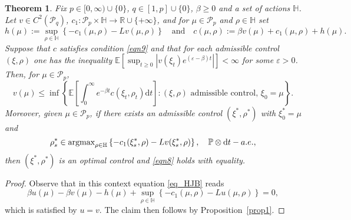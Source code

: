 \documentclass{article}
\newtheorem{theorem}{Theorem}[section]
\theoremstyle{definition}
\numberwithin{equation}{section}
\numberwithin{theorem}{section}
\newcommand{\E}{\mathbb{E}}
\renewcommand{\P}{\mathbb{P}}
\newcommand{\R}{\mathbb{R}}
\newcommand{\dt}{\mathrm{d}t}
\newcommand{\Hb}{\mathbb{H}}
\newcommand{\Pc}{\mathcal{P}}
\newcommand{\e}{\varepsilon}
\renewcommand{\P}{{\mathbb P}}
\newcommand{\Pcal}{{\mathcal P}}
\begin{document}
              
\begin{theorem}\label{thm1}
Fix $p \in [0,\infty) \cup \{0\}$, $q \in [1,p] \cup \{0\}$, $\beta\geq0$ and a set of actions $\Hb$. Let $v\in C^2(\Pcal_q)$, $c_1: \Pcal_p\times
  \mathbb{H} \to \R\cup\{+\infty\}$, and for  $\mu\in \Pcal_p$ and $\rho\in \mathbb H$ set
$$
    h(\mu) := \sup_{\rho \in \mathbb{H}} \left\{ -c_1(\mu, \rho) 
      -Lv(\mu,\rho)\right\}
      \quad\text{and}\quad
          c(\mu, \rho):= \beta v(\mu) + c_1(\mu, \rho) +h(\mu).
      $$
Suppose that $c$ satisfies condition \eqref{eqn9} and that for each admissible control $(\xi,\rho)$ one has the inequality $\E[\sup_{t\geq0}|v(\xi_t)e^{(\e-\beta) t}|]<\infty$ for some $\e>0$. Then, for $\mu\in\Pc_p$, 
\begin{equation}\label{eqn8}
v(\mu)\leq \inf\left\{  \E\left[ \int_0^\infty e^{-\beta t} c(\xi_t,\rho_t) \dt \right] \colon \text{$(\xi,\rho)$ admissible control, $\xi_0=\mu$}\right\}.
\end{equation}
Moreover, given $\mu\in\Pcal_p$, if there exists an admissible control $(\xi^*,\rho^*)$ with $\xi^*_0=\mu$ and
$$\rho_s^*\in{\textup{argmax}}_{\rho\in\Hb} \left\{ - c_1(\xi_s^*,\rho) - Lv(\xi_s^*,\rho) \right\},\quad \P\otimes \dt-a.e.,$$
then $(\xi^*,\rho^*)$ is an optimal control and \eqref{eqn8} holds with equality.
\end{theorem}

\begin{proof}
Observe that  in this context equation \eqref{eq_HJB} reads
$$\beta u(\mu) -\beta  v(\mu) -h(\mu)+\sup_{\rho\in\Hb}\left\{-c_1(\mu,\rho) - Lu(\mu,\rho) \right\} = 0,$$
which is  satisfied by $u= v$. 
The claim then follows by Proposition~\ref{prop1}.
\end{proof}
\end{document}
